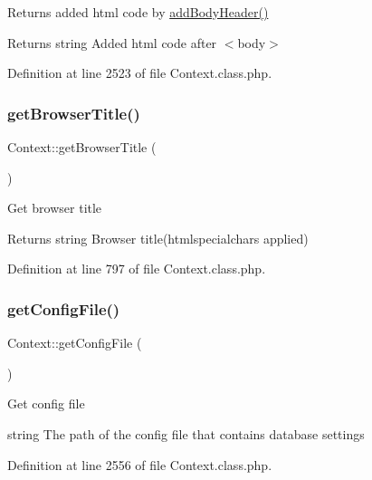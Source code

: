 Returns added html code by \hyperlink{classContext_ae7c9dad9ccd3e410283e21c67f395114}{add\+Body\+Header()}

\begin{DoxyReturn}{Returns}
string Added html code after $<$body$>$ 
\end{DoxyReturn}


Definition at line 2523 of file Context.\+class.\+php.

\hypertarget{classContext_a19f432349a41af2ed36b2cd5e6ba96a5}{}\label{classContext_a19f432349a41af2ed36b2cd5e6ba96a5} 
\subsubsection{\texorpdfstring{get\+Browser\+Title()}{getBrowserTitle()}}
{\footnotesize\ttfamily Context\+::get\+Browser\+Title (\begin{DoxyParamCaption}{ }\end{DoxyParamCaption})}

Get browser title

\begin{DoxyReturn}{Returns}
string Browser title(htmlspecialchars applied) 
\end{DoxyReturn}


Definition at line 797 of file Context.\+class.\+php.

\hypertarget{classContext_a7ac0928e07cfc7f19f9a7341c50b4811}{}\label{classContext_a7ac0928e07cfc7f19f9a7341c50b4811} 
\subsubsection{\texorpdfstring{get\+Config\+File()}{getConfigFile()}}
{\footnotesize\ttfamily Context\+::get\+Config\+File (\begin{DoxyParamCaption}{ }\end{DoxyParamCaption})}

Get config file

string The path of the config file that contains database settings 

Definition at line 2556 of file Context.\+class.\+php.

\hypertarget{classContext_a1b14cb135e24cc9c79414a50575cf309}{}\label{classContext_a1b14cb135e24cc9c79414a50575cf309} 
